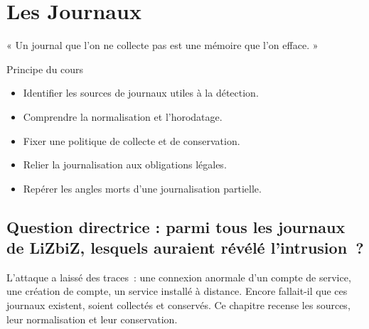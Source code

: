 
\chapter{Les Journaux}
\label{chap:journaux}

\epigraph{%
    « Un journal que l'on ne collecte pas est une mémoire que l'on efface. »%
}{Principe du cours}


\begin{boxobjectifs}
\begin{itemize}
    \item Identifier les sources de journaux utiles à la détection.
    \item Comprendre la normalisation et l'horodatage.
    \item Fixer une politique de collecte et de conservation.
    \item Relier la journalisation aux obligations légales.
    \item Repérer les angles morts d'une journalisation partielle.
\end{itemize}
\end{boxobjectifs}

\bigskip

\section*{Question directrice : parmi tous les journaux de LiZbiZ, lesquels auraient révélé l'intrusion~?}

L'attaque a laissé des traces~: une connexion anormale d'un compte de
service, une création de compte, un service installé à distance. Encore
fallait-il que ces journaux existent, soient collectés et conservés. Ce
chapitre recense les sources, leur normalisation et leur conservation.

